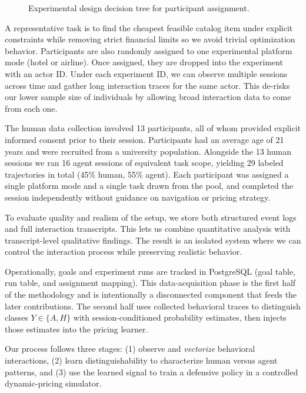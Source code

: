 \begin{figure}[ht]
  \centering
  \resizebox{0.88\columnwidth}{!}{%
    
  }
  \caption{Experimental design decision tree for participant assignment.}
  \label{fig:exp_design_tree}
\end{figure}

A representative task is to find the cheapest feasible catalog item under explicit constraints while removing strict financial limits so we avoid trivial optimization behavior. Participants are also randomly assigned to one experimental platform mode (hotel or airline). Once assigned, they are dropped into the experiment with an actor ID. Under each experiment ID, we can observe multiple sessions across time and gather long interaction traces for the same actor. This de-risks our lower sample size of individuals by allowing broad interaction data to come from each one.

The human data collection involved 13 participants, all of whom provided explicit informed consent prior to their session. Participants had an average age of 21 years and were recruited from a university population. Alongside the 13 human sessions we ran 16 agent sessions of equivalent task scope, yielding 29 labeled trajectories in total (45\% human, 55\% agent). Each participant was assigned a single platform mode and a single task drawn from the pool, and completed the session independently without guidance on navigation or pricing strategy.

To evaluate quality and realism of the setup, we store both structured event logs and full interaction transcripts. This lets us combine quantitative analysis with transcript-level qualitative findings. The result is an isolated system where we can control the interaction process while preserving realistic behavior.

Operationally, goals and experiment runs are tracked in PostgreSQL (goal table, run table, and assignment mapping). This data-acquisition phase is the first half of the methodology and is intentionally a disconnected component that feeds the later contributions. The second half uses collected behavioral traces to distinguish classes $Y \in \{A,H\}$ with session-conditioned probability estimates, then injects those estimates into the pricing learner.

Our process follows three stages: (1) observe and \textit{vectorize} behavioral interactions, (2) learn distinguishability to characterize human versus agent patterns, and (3) use the learned signal to train a defensive policy in a controlled dynamic-pricing simulator.

